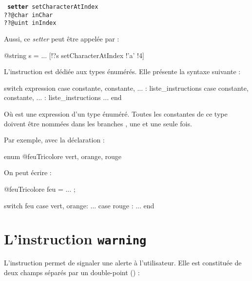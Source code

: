{{\texttt{
\textbf{setter} setCharacterAtIndex\\
\hspace*{2cm}??@char inChar\\
\hspace*{2cm}??@uint inIndex
}

Aussi, ce \emph{setter} peut être appelée par :
\begin{galgascode}
@string s = ...
[!?s setCharacterAtIndex !'a' !4]
\end{galgascode}







L'instruction  est dédiée aux types énumérés. Elle présente la syntaxe suivante :

\begin{galgascode}
switch expression
case constante, constante, ... :
  liste_instructions
case constante, constante, ... :
  liste_instructions
...
end
\end{galgascode}


Où  est une expression d'un type énuméré. Toutes les constantes de ce type doivent être nommées dans les branches , une et une seule fois.

Par exemple, avec la déclaration :

\begin{galgascode}
enum @feuTricolore {
  vert, orange, rouge   
}
\end{galgascode}

On peut écrire :

\begin{galgascode}
@feuTricolore feu = ... ;

switch feu
case vert, orange:
  ...
case rouge :
  ...
end
\end{galgascode}














\section{L'instruction \texttt{warning}}

L'instruction  permet de signaler une alerte à l'utilisateur. Elle est constituée de deux champs séparés par un double-point (\galgas{\:}) :

}}

